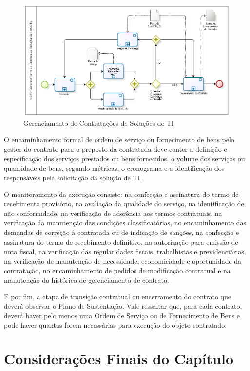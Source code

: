 \begin{figure}[H]
		\centering
		\label{fig05}
			\includegraphics[scale=0.6]{figuras/GCTI.png}
		\caption{Gerenciamento de Contratações de Soluções de TI   \cite{mcti}}
\end{figure}



O encaminhamento formal de ordem de serviço ou fornecimento de bens pelo gestor do contrato para o preposto da contratada deve conter a definição e especificação dos serviços prestados ou bens fornecidos, o volume dos serviços ou quantidade de bens, segundo métricas, o cronograma e a identificação dos responsáveis pela solicitação da solução de TI. 

O monitoramento da execução consiste: na confecção e assinatura do termo de recebimento provisório, na avaliação da qualidade do serviço, na identificação de não conformidade, na verificação de aderência aos termos contratuais, na verificação da manutenção das condições classificatórias, no encaminhamento das demandas de correção à contratada ou de indicação de sanções, na confecção e assinatura do termo de recebimento definitivo, na autorização para emissão de nota fiscal, na verificação das regularidades fiscais, trabalhistas e previdenciárias, na verificação de manutenção de necessidade, economicidade e oportunidade da contratação, no encaminhamento de pedidos de modificação contratual e na manutenção do histórico de gerenciamento de contrato. 

E por fim, a etapa de transição contratual ou encerramento do contrato que deverá observar o Plano de Sustentação. Vale ressaltar que, para cada contrato, deverá haver pelo menos uma Ordem de Serviço ou de Fornecimento de Bens e pode haver quantas forem necessárias para execução do objeto contratado.

\section[Considerações Finais do Capítulo]{Considerações Finais do Capítulo}

